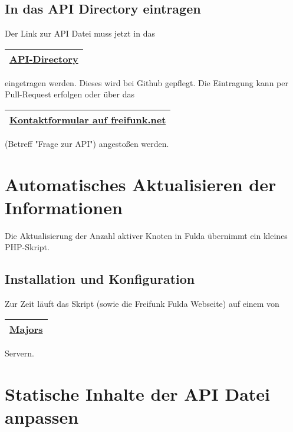 \subsection{In das API Directory eintragen}

Der Link zur API Datei muss jetzt in das%
\begin{tabular}{c}
\arrayrulecolor{FFmagenta} \hline
\href{https://github.com/freifunk/directory.api.freifunk.net/blob/master/directory.json}{API-Directory} \\
\hline
\end{tabular}
%
eingetragen werden. Dieses wird bei Github gepflegt. Die Eintragung kann per Pull-Request erfolgen oder über das%
\begin{tabular}{c}
\arrayrulecolor{FFmagenta} \hline
\href{http://freifunk.net/kontakt/}{Kontaktformular auf freifunk.net} \\
\hline
\end{tabular}
%
(Betreff "Frage zur API") angestoßen werden.

\section{Automatisches Aktualisieren der Informationen}

Die Aktualisierung der Anzahl aktiver Knoten in Fulda übernimmt ein kleines PHP-Skript.

\subsection{Installation und Konfiguration}
Zur Zeit läuft das Skript (sowie die Freifunk Fulda Webseite) auf einem von%
\begin{tabular}{c}
\arrayrulecolor{FFmagenta} \hline
\href{https://wiki.mag.lab.sh/wiki/Benutzer:Major}{Majors} \\
\hline
\end{tabular}
%
Servern.\\




\section{Statische Inhalte der API Datei anpassen}

